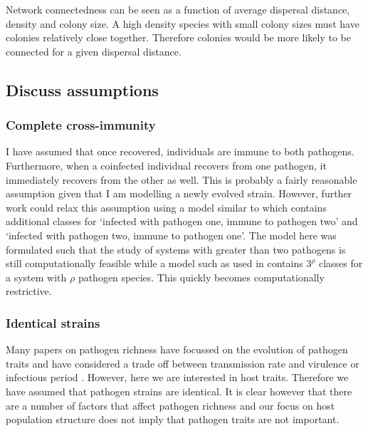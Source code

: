 Network connectedness can be seen as a function of average dispersal distance, density and colony size.
A high density species with small colony sizes must have colonies relatively close together.
Therefore colonies would be more likely to be connected for a given dispersal distance. 


\subsection{Discuss assumptions}

\subsubsection{Complete cross-immunity}

I have assumed that once recovered, individuals are immune to both pathogens. 
Furthermore, when a coinfected individual recovers from one pathogen, it immediately recovers from the other as well.
This is probably a fairly reasonable assumption given that I am modelling a newly evolved strain.
However, further work could relax this assumption using a model similar to \cite{poletto2015characterising} which contains additional classes for `infected with pathogen one, immune to pathogen two' and `infected with pathogen two, immune to pathogen one'.
The model here was formulated such that the study of systems with greater than two pathogens is still computationally feasible while a model such as used in \cite{poletto2015characterising} contains $3^\rho$ classes for a system with $\rho$ pathogen species.
This quickly becomes computationally restrictive.

\subsubsection{Identical strains}

Many papers on pathogen richness have focussed on the evolution of pathogen traits and have considered a trade off between transmission rate and virulence \cite{nowak1994superinfection, nowak1994superinfection} or infectious period \cite{poletto2013host}.
However, here we are interested in host traits.
Therefore we have assumed that pathogen strains are identical.
It is clear however that there are a number of factors that affect pathogen richness and our focus on host population structure does not imply that pathogen traits are not important.




